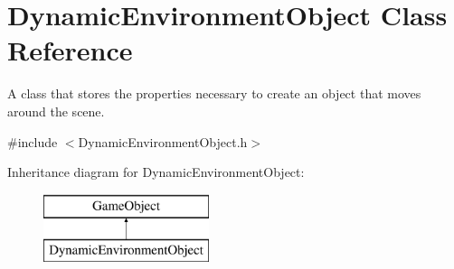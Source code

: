 \hypertarget{class_dynamic_environment_object}{}\section{Dynamic\+Environment\+Object Class Reference}
\label{class_dynamic_environment_object}


A class that stores the properties necessary to create an object that moves around the scene.  




{\ttfamily \#include $<$Dynamic\+Environment\+Object.\+h$>$}

Inheritance diagram for Dynamic\+Environment\+Object\+:\begin{figure}[H]
\begin{center}
\leavevmode
\includegraphics[height=2.000000cm]{class_dynamic_environment_object}
\end{center}
\end{figure}
